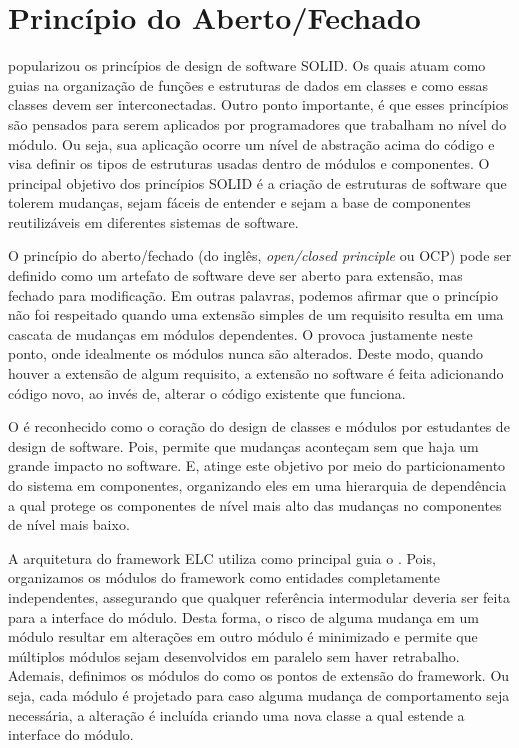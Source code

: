 \documentclass[12pt]{tcc}
\begin{document}
		\section{Princípio do Aberto/Fechado}
		\label{sec:solid-ocp}
		\citet{MartinCleanArchtecture2017} popularizou os princípios de design de software SOLID.
		Os quais atuam como guias na organização de funções e estruturas de dados em classes e como essas classes devem ser interconectadas.
		Outro ponto importante, é que esses princípios são pensados para serem aplicados por programadores que trabalham no nível do módulo.
		Ou seja, sua aplicação ocorre um nível de abstração acima do código e visa definir os tipos de estruturas usadas dentro de módulos e componentes.
		O principal objetivo dos princípios SOLID é a criação de estruturas de software que tolerem mudanças, sejam fáceis de entender e sejam a base de componentes reutilizáveis em diferentes sistemas de software.

		O princípio do aberto/fechado (do inglês, \emph{open/closed principle} ou OCP) pode ser definido como um artefato de software deve ser aberto para extensão, mas fechado para modificação. \citep{Meyer1997ObjectOrientedSoftwareConstruction}
		Em outras palavras, podemos afirmar que o princípio não foi respeitado quando uma extensão simples de um requisito resulta em uma cascata de mudanças em módulos dependentes.
		O  provoca justamente neste ponto, onde idealmente os módulos nunca são alterados.
		Deste modo, quando houver a extensão de algum requisito, a extensão no software é feita adicionando código novo, ao invés de, alterar o código existente que funciona. \citep{Martin2000TheOP}

		O  é reconhecido como o coração do design de classes e módulos por estudantes de design de software. \citep{MartinCleanArchtecture2017}
		Pois, permite que mudanças aconteçam sem que haja um grande impacto no software.
		E, atinge este objetivo por meio do particionamento do sistema em componentes, organizando eles em uma hierarquia de dependência a qual protege os componentes de nível mais alto das mudanças no componentes de nível mais baixo. \citep{MartinCleanArchtecture2017}

		A arquitetura do framework ELC utiliza como principal guia o .
		Pois, organizamos os módulos do framework como entidades completamente independentes, assegurando que qualquer referência intermodular deveria ser feita para a interface do módulo.
		Desta forma, o risco de alguma mudança em um módulo resultar em alterações em outro módulo é minimizado e permite que múltiplos módulos sejam desenvolvidos em paralelo sem haver retrabalho.
		Ademais, definimos os módulos do  como os pontos de extensão do framework.
		Ou seja, cada módulo é projetado para caso alguma mudança de comportamento seja necessária, a alteração é incluída criando uma nova classe a qual estende a interface do módulo.
\end{document}
